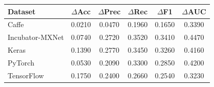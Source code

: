 \begin{tabular}{lccccc}
\toprule
Dataset & $\Delta$Acc & $\Delta$Prec & $\Delta$Rec & $\Delta$F1 & $\Delta$AUC \\
\midrule
Caffe & 0.0210 & 0.0470 & 0.1960 & 0.1650 & 0.3390 \\
Incubator-MXNet & 0.0740 & 0.2720 & 0.3520 & 0.3410 & 0.4470 \\
Keras & 0.1390 & 0.2770 & 0.3450 & 0.3260 & 0.4160 \\
PyTorch & 0.0530 & 0.2090 & 0.3300 & 0.2850 & 0.4200 \\
TensorFlow & 0.1750 & 0.2400 & 0.2660 & 0.2540 & 0.3230 \\
\bottomrule
\end{tabular}